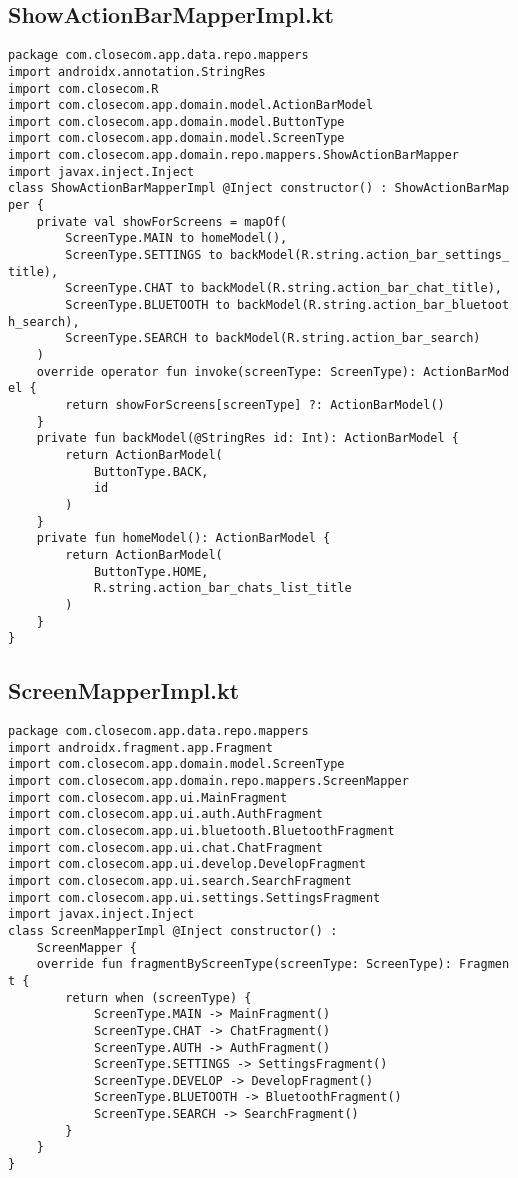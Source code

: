 \documentclass[listing]{espd}
\begin{document}
\subsection{ShowActionBarMapperImpl.kt}
\begin{verbatim}
package com.closecom.app.data.repo.mappers
import androidx.annotation.StringRes
import com.closecom.R
import com.closecom.app.domain.model.ActionBarModel
import com.closecom.app.domain.model.ButtonType
import com.closecom.app.domain.model.ScreenType
import com.closecom.app.domain.repo.mappers.ShowActionBarMapper
import javax.inject.Inject
class ShowActionBarMapperImpl @Inject constructor() : ShowActionBarMap
per {
    private val showForScreens = mapOf(
        ScreenType.MAIN to homeModel(),
        ScreenType.SETTINGS to backModel(R.string.action_bar_settings_
title),
        ScreenType.CHAT to backModel(R.string.action_bar_chat_title),
        ScreenType.BLUETOOTH to backModel(R.string.action_bar_bluetoot
h_search),
        ScreenType.SEARCH to backModel(R.string.action_bar_search)
    )
    override operator fun invoke(screenType: ScreenType): ActionBarMod
el {
        return showForScreens[screenType] ?: ActionBarModel()
    }
    private fun backModel(@StringRes id: Int): ActionBarModel {
        return ActionBarModel(
            ButtonType.BACK,
            id
        )
    }
    private fun homeModel(): ActionBarModel {
        return ActionBarModel(
            ButtonType.HOME,
            R.string.action_bar_chats_list_title
        )
    }
}
\end{verbatim}

\subsection{ScreenMapperImpl.kt}
\begin{verbatim}
package com.closecom.app.data.repo.mappers
import androidx.fragment.app.Fragment
import com.closecom.app.domain.model.ScreenType
import com.closecom.app.domain.repo.mappers.ScreenMapper
import com.closecom.app.ui.MainFragment
import com.closecom.app.ui.auth.AuthFragment
import com.closecom.app.ui.bluetooth.BluetoothFragment
import com.closecom.app.ui.chat.ChatFragment
import com.closecom.app.ui.develop.DevelopFragment
import com.closecom.app.ui.search.SearchFragment
import com.closecom.app.ui.settings.SettingsFragment
import javax.inject.Inject
class ScreenMapperImpl @Inject constructor() :
    ScreenMapper {
    override fun fragmentByScreenType(screenType: ScreenType): Fragmen
t {
        return when (screenType) {
            ScreenType.MAIN -> MainFragment()
            ScreenType.CHAT -> ChatFragment()
            ScreenType.AUTH -> AuthFragment()
            ScreenType.SETTINGS -> SettingsFragment()
            ScreenType.DEVELOP -> DevelopFragment()
            ScreenType.BLUETOOTH -> BluetoothFragment()
            ScreenType.SEARCH -> SearchFragment()
        }
    }
}
\end{verbatim}
\end{document}
